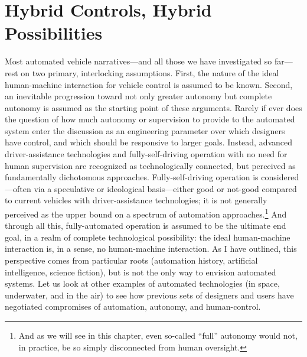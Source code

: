 \chapter{Hybrid Controls, Hybrid Possibilities}
\label{chap:3}






Most automated vehicle narratives---and all those we have investigated
so far---rest on two primary, interlocking assumptions. First, the nature of the
ideal human-machine interaction for vehicle control is assumed to be
known. Second, an inevitable progression toward not only greater
autonomy but complete autonomy is assumed as the
starting point of these arguments. Rarely if ever does the question of
how much autonomy or supervision to provide to the automated system
enter the discussion as an engineering parameter over which designers
have control, and which should be responsive to larger goals. Instead,
advanced driver-assistance technologies and fully-self-driving
operation with no need for human supervision are recognized as
technologically connected, but perceived as fundamentally dichotomous
approaches. Fully-self-driving operation is considered---often via a
speculative or ideological basis---either good or not-good compared to
current vehicles with driver-assistance technologies; it is not generally
perceived as the upper bound on a spectrum of automation
approaches.\footnote{And as we will see in this chapter, even
  so-called ``full'' autonomy would not, in practice, be so simply
  disconnected from human oversight.} And through all this,
fully-automated operation is assumed to be the ultimate end goal, in a
realm of complete technological possibility: the ideal human-machine
interaction is, in a sense, no human-machine interaction. As I have
outlined, this perspective comes from particular roots (automation
history, artificial intelligence, science fiction), but is not the
only way to envision automated systems. Let us look at
other examples of automated technologies (in space, underwater, and in
the air) to see how previous sets of designers and users have
negotiated compromises of automation, autonomy, and human-control.

